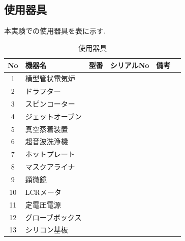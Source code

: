 \documentclass[11pt]{jarticle}
\begin{document}
	\subsection{使用器具}
		本実験での使用器具を表に示す.
		\begin{table}[H]
		\begin{center}
		\caption{使用器具}
		\label{tab:used}
		\begin{tabular}{clllll} \toprule
		No&\multicolumn{1}{l}{機器名}&\multicolumn{1}{l}{型番}&\multicolumn{1}{l}{シリアルNo}&\multicolumn{1}{l}{備考}\\ \hline
		1&横型管状電気炉&&&\\
		2&ドラフター&&&\\
		3&スピンコーター&&&\\
		4&ジェットオーブン&&&\\
		5&真空蒸着装置&&&\\
		6&超音波洗浄機&&&\\
		7&ホットプレート&&&\\
		8&マスクアライナ&&&\\
		9&顕微鏡&&&\\
		10&LCRメータ&&&\\
		11&定電圧電源&&&\\
		12&グローブボックス&&&\\
		13&シリコン基板&&&\\ \bottomrule
		\end{tabular}
		\end{center}
		\end{table}
\end{document}
